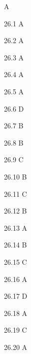 \begin{Solution}{26}
A
\end{Solution}
\begin{Solution}{26.{1}}
A
\end{Solution}
\begin{Solution}{26.{2}}
A
\end{Solution}
\begin{Solution}{26.{3}}
A
\end{Solution}
\begin{Solution}{26.{4}}
A
\end{Solution}
\begin{Solution}{26.{5}}
A
\end{Solution}
\begin{Solution}{26.{6}}
D
\end{Solution}
\begin{Solution}{26.{7}}
B
\end{Solution}
\begin{Solution}{26.{8}}
B
\end{Solution}
\begin{Solution}{26.{9}}
C
\end{Solution}
\begin{Solution}{26.{10}}
B
\end{Solution}
\begin{Solution}{26.{11}}
C
\end{Solution}
\begin{Solution}{26.{12}}
B
\end{Solution}
\begin{Solution}{26.{13}}
A
\end{Solution}
\begin{Solution}{26.{14}}
B
\end{Solution}
\begin{Solution}{26.{15}}
C
\end{Solution}
\begin{Solution}{26.{16}}
A
\end{Solution}
\begin{Solution}{26.{17}}
D
\end{Solution}
\begin{Solution}{26.{18}}
A
\end{Solution}
\begin{Solution}{26.{19}}
C
\end{Solution}
\begin{Solution}{26.{20}}
A
\end{Solution}
